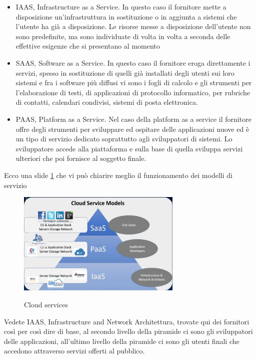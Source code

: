 \begin{itemize}
    \item IAAS, Infrastructure as a Service. In questo caso il fornitore mette a disposizione un'infrastruttura in sostituzione o in aggiunta a sistemi che l'utente ha già a disposizione. Le risorse messe a disposizione dell'utente non sono predefinite, ma sono individuate di volta in volta a seconda delle effettive esigenze che si presentano al momento
    \item SAAS, Software as a Service. In questo caso il fornitore eroga direttamente i servizi, spesso in sostituzione di quelli già installati degli utenti sui loro sistemi e fra i software più diffusi vi sono i fogli di calcolo e gli strumenti per l'elaborazione di testi, di applicazioni di protocollo informatico, per rubriche di contatti, calendari condivisi, sistemi di posta elettronica.
    \item PAAS, Platform as a Service. Nel caso della platform as a service il fornitore offre degli strumenti per sviluppare ed ospitare delle applicazioni nuove ed è un tipo di servizio dedicato soprattutto agli sviluppatori di sistemi. Lo sviluppatore accede alla piattaforma e sulla base di quella sviluppa servizi ulteriori che poi fornisce al soggetto finale. 
\end{itemize}   

Ecco una slide \ref{fig:Cloud_services} che vi può chiarire meglio il funzionamento dei modelli di servizio   

\begin{figure}[ht!]
    \centering
    \includegraphics[width=0.7\textwidth]{images/17_lez_fig_02}
    \label{fig:Cloud_services}
    \caption{Cloud services}
\end{figure}

Vedete IAAS, Infrastructure and Network Architettura, trovate qui dei fornitori così per così dire di base, al secondo livello della piramide ci sono gli sviluppatori delle applicazioni, all'ultimo livello della piramide ci sono gli utenti finali che accedono attraverso servizi offerti al pubblico. 

